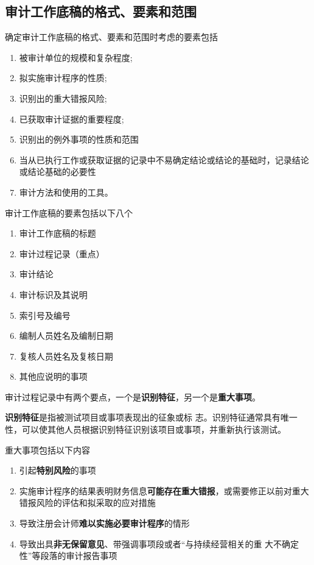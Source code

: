 \documentclass[UTF8,12pt]{ctexart}
\numberwithin{equation}{section} %
\numberwithin{figure}{section}
\numberwithin{table}{section}
\begin{document}
	\subsection{审计工作底稿的格式、要素和范围}
	确定审计工作底稿的格式、要素和范围时考虑的要素包括
	\begin{enumerate}
		\item 被审计单位的规模和复杂程度;
		
		\item 拟实施审计程序的性质;
		
		\item 识别出的重大错报风险;
		
		\item 已获取审计证据的重要程度;
		
		\item 识别出的例外事项的性质和范围
		
		\item 当从已执行工作或获取证据的记录中不易确定结论或结论的基础时，记录结论或结论基础的必要性
		
		\item 审计方法和使用的工具。
	\end{enumerate}
	
	审计工作底稿的要素包括以下八个
	\begin{enumerate}
		\item 审计工作底稿的标题
		
		\item 审计过程记录（重点）
		
		\item 审计结论
		
		\item 审计标识及其说明
		
		\item 索引号及编号
		
		\item 编制人员姓名及编制日期
		
		\item 复核人员姓名及复核日期
		
		\item 其他应说明的事项
	\end{enumerate}
	
	审计过程记录中有两个要点，一个是\textbf{识别特征}，另一个是\textbf{重大事项}。
	
	\textbf{识别特征}是指被测试项目或事项表现出的征象或标 志。识别特征通常具有唯一性，可以使其他人员根据识别特征识别该项目或事项，并重新执行该测试。
	
	重大事项包括以下内容
	\begin{enumerate}
		\item 引起\textbf{特别风险}的事项
		
		\item 实施审计程序的结果表明财务信息\textbf{可能存在重大错报}，或需要修正以前对重大错报风险的评估和拟采取的应对措施
		
		\item 导致注册会计师\textbf{难以实施必要审计程序}的情形
		
		\item 导致出具\textbf{非无保留意见}、带强调事项段或者“与持续经营相关的重 大不确定性”等段落的审计报告事项
	\end{enumerate}
	
\end{document}
